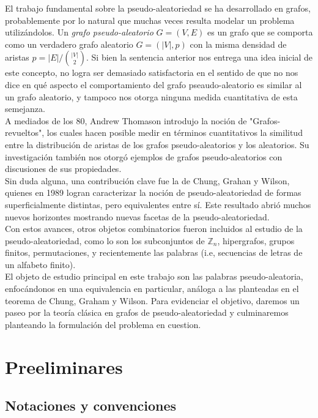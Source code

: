 \documentclass{article}[14pts]
\begin{document}
El trabajo fundamental sobre la pseudo-aleatoriedad se ha desarrollado en grafos, probablemente por lo natural que muchas veces resulta modelar un problema utilizándolos. Un \emph{grafo pseudo-aleatorio} $G = (V,E)$ es un grafo que se comporta como un verdadero grafo aleatorio $G = (|V|,p)$ con la misma densidad de aristas $p= |E| \Big/ \binom{|V|}{2}$. Si bien la sentencia anterior nos entrega una idea inicial de este concepto, no logra ser demasiado satisfactoria en el sentido de que no nos dice en qué aspecto  el comportamiento del grafo pseaudo-aleatorio es similar al un grafo aleatorio, y tampoco nos otorga ninguna medida cuantitativa de esta semejanza.\\

A mediados de los 80, Andrew Thomason introdujo la noción de "Grafos-revueltos", los cuales hacen posible medir en términos cuantitativos la similitud entre la distribución de aristas de los grafos pseudo-aleatorios y los aleatorios. Su investigación también nos otorgó ejemplos de grafos pseudo-aleatorios con discusiones de sus propiedades.\\

Sin duda alguna, una contribución clave fue la de Chung, Grahan y Wilson, quienes en 1989 logran caracterizar la noción de pseudo-aleatoriedad de formas superficialmente distintas, pero equivalentes entre sí. Este resultado abrió muchos nuevos horizontes mostrando nuevas facetas de la pseudo-aleatoriedad.\\

Con estos avances, otros objetos combinatorios fueron incluidos al estudio de la pseudo-aleatoriedad, como lo son los subconjuntos de $\mathbb{Z}_n$, hipergrafos, grupos finitos, permutaciones, y recientemente las palabras (i.e, secuencias de letras de un alfabeto finito).\\

El objeto de estudio principal en este trabajo son las palabras pseudo-aleatoria, enfocándonos en una equivalencia en particular, análoga a las planteadas en el teorema de Chung, Graham y Wilson. Para evidenciar el objetivo, daremos un paseo por la teoría clásica en grafos de pseudo-aleatoriedad y culminaremos planteando la formulación del problema en cuestion.

\section{Preeliminares}

\subsection{Notaciones y convenciones}
\end{document}

